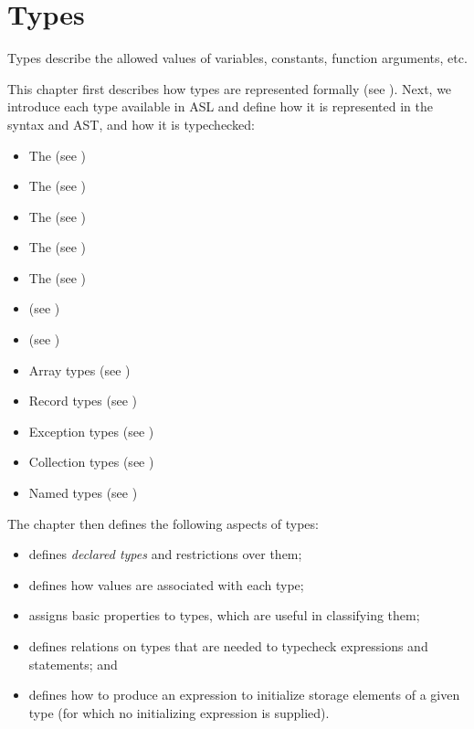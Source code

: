 \chapter{Types\label{chap:Types}}

Types describe the allowed values of variables, constants, function arguments, etc.

This chapter first describes how types are represented formally (see ).
Next, we introduce each type available in ASL and define
how it is represented in the syntax and AST, and how it is typechecked:
\begin{itemize}
  \item The \integertypeterm{} (see )
  \item The \realtypeterm{} (see )
  \item The \stringtypeterm{} (see )
  \item The \booleantypeterm{} (see )
  \item The \bitvectortypeterm{} (see )
  \item \Tupletypesterm{} (see )
  \item \Enumerationtypesterm{} (see )
  \item Array types (see )
  \item Record types (see )
  \item Exception types (see )
  \item Collection types (see )
  \item Named types (see )
\end{itemize}

The chapter then defines the following aspects of types:
\begin{itemize}
\item {} defines \emph{declared types} and restrictions over them;
\item {} defines how values are associated with each type;
\item {} assigns basic properties to types, which are useful
in classifying them;
\item {} defines relations on types that are needed to typecheck
expressions and statements; and
\item {} defines how to produce an expression to initialize storage
      elements of a given type (for which no initializing expression is supplied).
\end{itemize}

